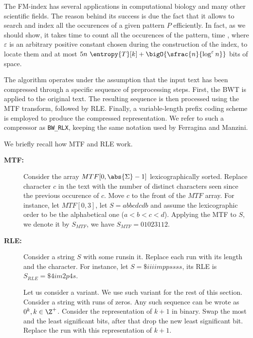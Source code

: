 \documentclass{subfiles}
\begin{document}
    The FM-index has several applications in computational biology and many other scientific fields.
        The reason behind its success is due the fact that it allows to search and index 
        all the occurences of a given pattern \(P\) efficiently. In fact, as we should show, 
        it takes time  to count all the occurences of the pattern, 
        time , where \(\varepsilon\) is an arbitrary positive constant chosen 
        during the construction of the index, to locate them and at most 
        \(5n \ \entropy{T}[k] + \bigO{\sfrac{n}{\log^{\varepsilon} n}}\) bits of space.

    The algorithm operates under the assumption that the input text has been compressed through 
        a specific sequence of preprocessing steps. First, the BWT is applied to the original text.
        The resulting sequence is then processed using the MTF transform, followed by RLE. 
        Finally, a variable-length prefix coding scheme is employed to produce the compressed representation.
        We refer to such a compressor as \lstinline{BW_RLX}, keeping the same notation used by Ferragina and Manzini.

    We briefly recall how MTF and RLE work.
    \begin{description}
        \item [\textbf{MTF:}] Consider the array \(MTF[0, \abs{\Sigma} - 1]\) lexicographically sorted. 
            Replace character \(c\) in the text with the number of distinct characters seen since the previous occurence of \(c\).
            Move \(c\) to the front of the \(MTF\) array.
            For instance, let \(MTF[0, 3]\), let \(S = abbcdcdb\) and assume the lexicographic order to be the alphabetical one
            (\(a < b < c < d\)). Applying the MTF to \(S\), we denote it by \(S_{MTF}\), we have \(S_{MTF} = 01023112\).

        \item [\textbf{RLE:}] Consider a string \(S\) with some runs\footnotemark in it.
            Replace each run with its length and the character. For instance,
            let \(S = \$iiiimppssss\), its RLE is \(S_{RLE} = \$4im2p4s\).
            
            Let us consider a variant. We use such variant for the rest of this section. 
            Consider a string with runs of zeros. Any such sequence can be wrote as \(0^{k}, k \in \Z^{+}\).
            Consider the representation of \(k + 1\) in binary. Swap the most and the least significant bits,
            after that drop the new least significant bit. Replace the run with this representation of \(k + 1\).
    \end{description}

\end{document}
